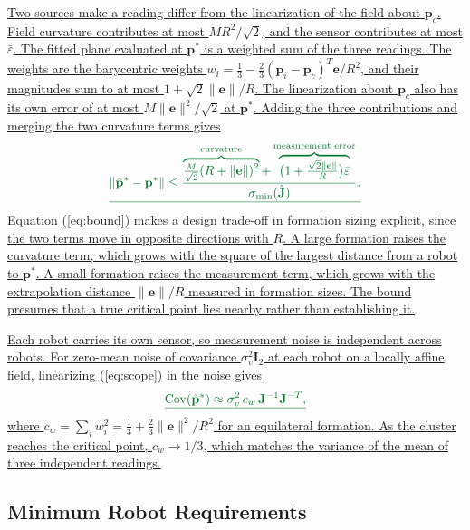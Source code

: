 \documentclass[lettersize,journal]{IEEEtran}
\providecommand{\DIFadd}[1]{{\protect\color{DIFaddtx}\uline{#1}}} %
\providecommand{\DIFaddend}{\protect\color{black}} %
\DeclareRobustCommand{\DIFaddend}{\DIFOaddend \let\includegraphics\DIFOincludegraphics} %
\begin{document}
\DIFadd{Two sources make a reading differ from the linearization of the field about $\mathbf{p}_c$. Field curvature contributes at most $MR^2/\sqrt{2}$, and the sensor contributes at most $\bar{\varepsilon}$. The fitted plane evaluated at $\mathbf{p}^*$ is a weighted sum of the three readings. The weights are the barycentric weights $w_i = \frac{1}{3} - \frac{2}{3}(\mathbf{p}_i - \mathbf{p}_c)^T\mathbf{e}/R^2$, and their magnitudes sum to at most $1 + \sqrt{2}\|\mathbf{e}\|/R$. The linearization about $\mathbf{p}_c$ also has its own error of at most $M\|\mathbf{e}\|^2/\sqrt{2}$ at $\mathbf{p}^*$. Adding the three contributions and merging the two curvature terms gives
}\begin{equation}\DIFadd{\label{eq:bound}
\|\hat{\mathbf{p}}^* - \mathbf{p}^*\| \le \frac{\overbrace{\tfrac{M}{\sqrt{2}}(R + \|\mathbf{e}\|)^2}^{\text{curvature}} + \overbrace{\bigl(1 + \tfrac{\sqrt{2}\|\mathbf{e}\|}{R}\bigr)\bar{\varepsilon}}^{\text{measurement error}}}{\sigma_{\min}(\hat{\mathbf{J}})}.
}\end{equation}
\DIFadd{Equation (\ref{eq:bound}) makes a design trade-off in formation sizing explicit, since the two terms move in opposite directions with $R$. A large formation raises the curvature term, which grows with the square of the largest distance from a robot to $\mathbf{p}^*$. A small formation raises the measurement term, which grows with the extrapolation distance $\|\mathbf{e}\|/R$ measured in formation sizes. The bound presumes that a true critical point lies nearby rather than establishing it.
}

\DIFadd{Each robot carries its own sensor, so measurement noise is independent across robots. For zero-mean noise of covariance $\sigma_v^2\mathbf{I}_2$ at each robot on a locally affine field, linearizing (\ref{eq:scope}) in the noise gives
}\begin{equation}\DIFadd{\label{eq:cov}
\operatorname{Cov}(\hat{\mathbf{p}}^*) \approx \sigma_v^2\, c_w\, \mathbf{J}^{-1}\mathbf{J}^{-T},
}\end{equation}
\DIFadd{where $c_w = \sum_i w_i^2 = \frac{1}{3} + \frac{2}{3}\|\mathbf{e}\|^2/R^2$ for an equilateral formation. As the cluster reaches the critical point, $c_w \to 1/3$, which matches the variance of the mean of three independent readings.
}


\DIFaddend \subsection{Minimum Robot Requirements}
\end{document}
